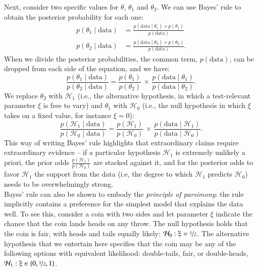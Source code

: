 \documentclass[man, floatsintext]{apa7} %
\begin{document}
Next, consider two specific values for $\theta$, $\theta_1$ and $\theta_2$. We can use Bayes' rule to obtain the posterior probability for each one:
\begin{align}
p(\theta_1 \mid \text{data})& =  \frac{p(\text{data} \mid \theta_1) \times p(\theta_1)}{p(\text{data})}\\
p(\theta_2 \mid \text{data})& =  \frac{p(\text{data} \mid \theta_2) \times p(\theta_2)}{p(\text{data})}.
\end{align}
When we divide the posterior probabilities, the common term, $p(\text{data})$, can be dropped from each side of the equation, and we have:
\begin{equation}
    \frac{p(\theta_1 \mid \text{data})}{p(\theta_2 \mid \text{data})} = \frac{p(\theta_1)}{p(\theta_2)} \, \times \, \frac{p(\text{data} \mid \theta_1)}{p(\text{data} \mid \theta_2)}.
\end{equation}
We replace $\theta_2$ with $\mathcal{H}_1$ (i.e., the alternative hypothesis, in which a test-relevant parameter $\xi$ is free to vary) and $\theta_1$ with $\mathcal{H}_0$ (i.e., the null hypothesis in which $\xi$ takes on a fixed value, for instance $\xi=0$):
\begin{equation}
    \frac{p(\mathcal{H}_1 \mid \text{data})}{p(\mathcal{H}_0 \mid \text{data})} = \frac{p(\mathcal{H}_1)}{p(\mathcal{H}_0)} \, \times \, \frac{p(\text{data} \mid \mathcal{H}_1)}{p(\text{data} \mid \mathcal{H}_0)}.
\end{equation}
This way of writing Bayes' rule highlights that extraordinary claims require extraordinary evidence -- if a particular hypothesis $\mathcal{H}_1$ is extremely unlikely a priori, the prior odds $\frac{p(\mathcal{H}_1)}{p(\mathcal{H}_0)}$ are stacked against it, and for the posterior odds to favor $\mathcal{H}_1$ the support from the data (i.e, the degree to which $\mathcal{H}_1$ predicts $\mathcal{H}_0$) needs to be overwhelmingly strong. \\  

Bayes' rule can also be shown to embody the \emph{principle of parsimony}: the rule implicitly contains a preference for the simplest model that explains the data well. To see this, consider a coin with two sides and let parameter $\xi$ indicate the chance that the coin lands heads on any throw. The null hypothesis holds that the coin is fair, with heads and tails equally likely: $\mathcal{H}_0: \xi = \nicefrac{1}{2}$. The alternative hypothesis that we entertain here specifies that the coin may be any of the following options with equivalent likelihood: double-tails, fair, or double-heads, $\mathcal{H}_1: \xi \in \{0, \nicefrac{1}{2}, 1\}$. \\
\end{document}
